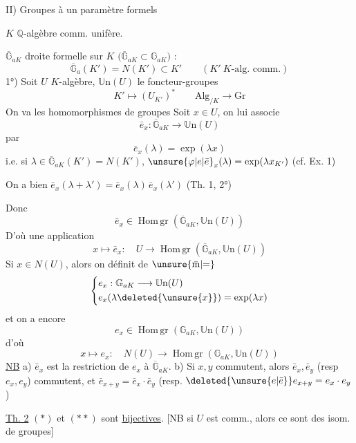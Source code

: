 II) Groupes à un paramètre formels

$K$ $\mathbb Q$-algèbre comm. unifère.

$\overline{\mathbb G}_{aK}$ droite formelle sur $K$ $\bigl(\overline{\mathbb G}_{aK}\subset\mathbb G_{aK}\bigr)$ :
\[
\overline{\mathbb G}_a(K')=N(K')\subset K'\qquad(K'\ K\text{-alg. comm.})
\]
1°) Soit $U$ $K$-algèbre, $\mathbb U\mathrm n(U)$ le foncteur-groupes
\[
K'\longmapsto (U_{K'})^*\qquad \mathrm{Alg}_{/K}\longrightarrow\mathrm{Gr}
\]
On va  les homomorphismes de groupes
Soit $x\in U$, on lui associe
\[
\bar e_x:\overline{\mathbb G}_{aK}\longrightarrow\mathbb U\mathrm n(U)
\]
par
\[
\bar e_x(\lambda)=\exp(\lambda x)
\]
i.e. si $\lambda\in\overline{\mathbb G}_{aK}(K')=N(K')$, $\unsure{\varphi|e|\bar e}_x(\lambda)=\exp(\lambda x_{K'})$ (cf. Ex. 1)

On a bien $\bar e_x(\lambda+\lambda')=\bar e_x(\lambda)\,\bar e_x(\lambda')$ (Th. 1, 2°)

Donc
\[
\bar e_x\in\operatorname{Hom\,gr}(\overline{\mathbb G}_{aK},\mathbb U\mathrm n(U))
\]
D'où une application
\[
x\longmapsto\bar e_x:\quad U\longrightarrow\operatorname{Hom\,gr}(\overline{\mathbb G}_{aK},\mathbb U\mathrm n(U))\tag*{($*$)}
\]
Si $x\in N(U)$, alors on définit de $\unsure{\bar{\mathrm m}|{=}}$
\[
\left\{\begin{aligned}
&e_x:\mathbb G_{aK}\longrightarrow\mathbb U\mathrm n(U)\\
&e_x(\lambda\deleted{\unsure{x}})=\exp(\lambda x)
\end{aligned}\right.
\]
et on a encore
\[
e_x\in\operatorname{Hom\,gr}(\mathbb G_{aK},\mathbb U\mathrm n(U))
\]
d'où
\[
x\longmapsto e_x:\quad N(U)\longrightarrow\operatorname{Hom\,gr}(\mathbb G_{aK},\mathbb U\mathrm n(U))\tag*{($**$)}
\]
\uline{NB} a) $\bar e_x$ est la restriction de $e_x$ à $\overline{\mathbb G}_{aK}$. b) Si $x,y$ commutent, alors $\bar e_x,\bar e_y$ (resp $e_x,e_y$) commutent, et $\bar e_{x+y}=\bar e_x\cdot\bar e_y$ (resp. $\deleted{\unsure{e|\bar e}}e_{x+y}=e_x\cdot e_y$)

\uline{Th. 2} $(*)$ et $(**)$ sont \uline{bijectives}. [NB si $U$ est comm., alors ce sont des isom. de groupes]

